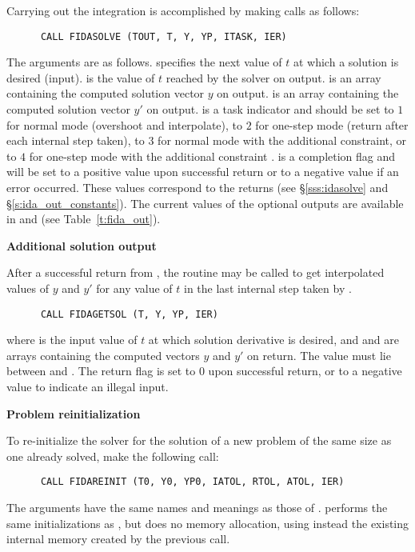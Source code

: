 \begin{Steps}
  Carrying out the integration is accomplished by making calls as follows:
\begin{verbatim}
      CALL FIDASOLVE (TOUT, T, Y, YP, ITASK, IER)
\end{verbatim}
  The arguments are as follows.
   specifies the next value of $t$ at which a solution is desired (input).
   is the value of $t$ reached by the solver on output.
   is an array containing the computed solution vector $y$ on output.
   is an array containing the computed solution vector $y'$ on output.
   is a task indicator and should be set to $1$ for normal mode 
  (overshoot  and interpolate), to $2$ for one-step mode 
  (return after each internal step taken), to $3$ for normal mode with
  the additional  constraint, or to $4$ for one-step mode 
  with the additional constraint .
   is a completion flag and will be set to a positive value upon
  successful return or to a negative value if an error occurred. These values
  correspond to the  returns (see \S\ref{sss:idasolve} and \S\ref{s:ida_out_constants}).
  The current values of the optional outputs are available in  and
   (see Table~\ref{t:fida_out}).
  
\item {\bf Additional solution output}

  After a successful return from , the routine  may
  be called to get interpolated values of $y$ and $y'$ for any value of $t$ in
  the last internal step taken by {\ida}.
\begin{verbatim}
      CALL FIDAGETSOL (T, Y, YP, IER)
\end{verbatim}
  where
   is the input value of $t$ at which solution derivative is desired, and
   and  are arrays containing the computed vectors $y$ and $y'$
  on return.  The value  must lie between  and .
  The return flag  is set to $0$ upon successful return, or to a
  negative value to indicate an illegal input.
  
\item {\bf Problem reinitialization}

  To re-initialize the {\ida} solver for the solution of a new problem
  of the same size as one already solved, make the following call:
\begin{verbatim}
      CALL FIDAREINIT (T0, Y0, YP0, IATOL, RTOL, ATOL, IER)
\end{verbatim}
  The arguments have the same names and meanings as those of .
   performs the same initializations as , but
  does no memory allocation, using instead the existing internal memory
  created by the previous  call.


\end{Steps}
